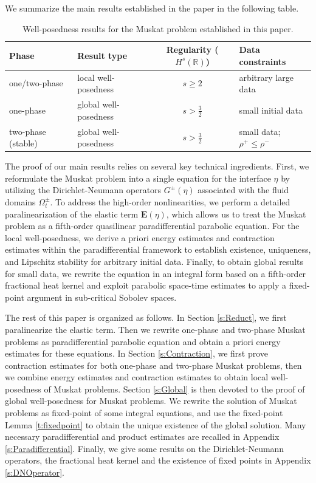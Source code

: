 \documentclass[12pt]{amsart}
\theoremstyle{definition}
\numberwithin{equation}{section}
\newcommand{\R}{\mathbb{R}}
\begin{document}
We summarize the main results established in the paper in the following table.
\begin{table}[ht]
\centering
\renewcommand{\arraystretch}{1.5}
\begin{tabular}{|l|l|c|l|}
\hline
\textbf{Phase} & \textbf{Result type} & \textbf{Regularity ($H^s(\R)$)} & \textbf{Data constraints} \\ \hline
one/two-phase & local well-posedness & $s \ge 2$ & arbitrary large data \\ \hline
one-phase & global well-posedness & $s > \frac{3}{2}$ & small initial data \\ \hline
two-phase (stable) & global well-posedness & $s > \frac{3}{2}$ & small data; $\rho^+ \le \rho^-$ \\ \hline
\end{tabular}
\caption{Well-posedness results for the Muskat problem established in this paper.}
\label{tab:muskat_results}
\end{table}

The proof of our main results relies on several key technical ingredients. 
First, we reformulate the Muskat problem into a single equation for the interface $\eta$ by utilizing the Dirichlet-Neumann operators $G^\pm(\eta)$ associated with the fluid domains $\Omega^\pm_t$. 
To address the high-order nonlinearities, we perform a detailed paralinearization of the elastic term $\mathbf{E}(\eta)$, which allows us to treat the Muskat problem as a fifth-order quasilinear paradifferential parabolic equation. 
For the local well-posedness, we derive a priori energy estimates and contraction estimates within the paradifferential framework to establish existence, uniqueness, and Lipschitz stability for arbitrary initial data. 
Finally, to obtain global results for small data, we rewrite the equation in an integral form based on a fifth-order fractional heat kernel and exploit parabolic space-time estimates to apply a fixed-point argument in sub-critical Sobolev spaces.

The rest of this paper is organized as follows.
In Section \ref{s:Reduct}, we first paralinearize the elastic term. 
Then we rewrite one-phase and two-phase Muskat problems as paradifferential parabolic equation and obtain a priori energy estimates for these equations.
In Section \ref{s:Contraction}, we first prove contraction estimates for both one-phase and two-phase Muskat problems, then we combine energy estimates and contraction estimates to obtain local well-posedness of Muskat problems.
Section \ref{s:Global} is then devoted to the proof of global well-posedness for Muskat problems.
We rewrite the solution of Muskat problems as fixed-point of some integral equations, and use the fixed-point Lemma \ref{t:fixedpoint} to obtain the unique existence of the global solution.
Many necessary paradifferential and product estimates are recalled in Appendix \ref{s:Paradifferential}.
Finally, we give some results on the Dirichlet-Neumann operators, the fractional heat kernel and the existence of fixed points in Appendix \ref{s:DNOperator}.
\end{document}
